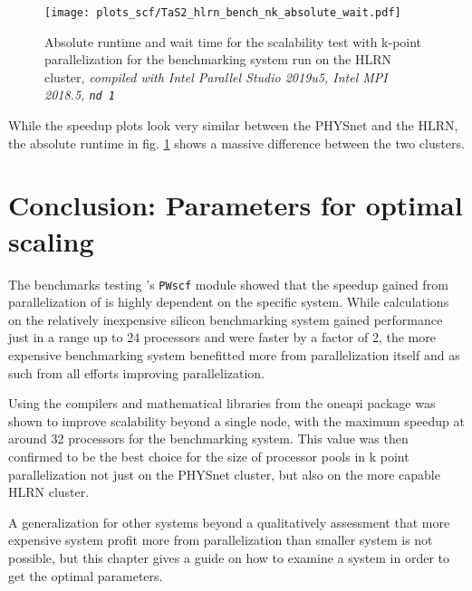 \documentclass[main.tex]{subfiles}
\begin{document}
\begin{figure}[ht!]
    \centering
    \texttt{[image: plots\_scf/TaS2\_hlrn\_bench\_nk\_absolute\_wait.pdf]}
\caption{Absolute runtime and wait time for the scalability test with k-point parallelization for the \TaS benchmarking system run on the HLRN cluster, \emph{\QE compiled with Intel Parallel Studio 2019u5, Intel MPI 2018.5, \texttt{nd 1}}}
\label{fig:scaling_scf_hlrn_nk_TaS2_absolute_wait}
\end{figure}
While the speedup plots look very similar between the PHYSnet and the HLRN, the absolute runtime in fig. \ref{fig:scaling_scf_hlrn_nk_TaS2_absolute_wait} shows a massive difference between the two clusters.

\section{Conclusion: Parameters for optimal scaling}

The benchmarks testing \QE 's \texttt{PWscf} module showed that the speedup gained from parallelization of is highly dependent on the specific system.
While calculations on the relatively inexpensive silicon benchmarking system gained performance just in a range up to 24 processors and were faster by a factor of 2, the more expensive \TaS benchmarking system benefitted more from parallelization itself and as such from all efforts improving parallelization.

Using the compilers and mathematical libraries from the \gls{oneapi} package was shown to improve scalability beyond a single node, with the maximum speedup at around 32 processors for the \TaS benchmarking system.
This value was then confirmed to be the best choice for the size of processor pools in k point parallelization not just on the PHYSnet cluster, but also on the more capable HLRN cluster.

A generalization for other systems beyond a qualitatively assessment that more expensive system profit more from parallelization than smaller system is not possible, but this chapter gives a guide on how to examine a system in order to get the optimal parameters.
\end{document}
